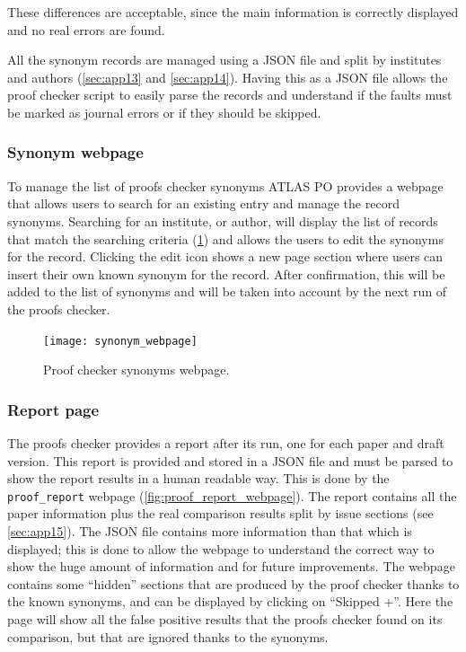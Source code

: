 These differences are acceptable, since the main information is correctly displayed and no real errors are found.

All the synonym records are managed using a JSON file and split by institutes and authors (\cref{sec:app13} and \cref{sec:app14}).
Having this as a JSON file allows the proof checker script to easily parse the records and understand if the faults must be marked as journal errors or if they should be skipped.

\subsubsection{Synonym webpage}
\label{sec:Synonym_webpage}

To manage the list of proofs checker synonyms ATLAS PO provides a webpage that allows users to search for an existing entry and manage the record synonyms. 
Searching for an institute, or author, will display the list of records that match the searching criteria (\cref{fig:synonym_webpage}) and allows the users to edit the synonyms for the record.
Clicking the edit icon shows a new page section where users can insert their own known synonym for the record.
After confirmation, this will be added to the list of synonyms and will be taken into account by the next run of the proofs checker.

\begin{figure}[htb]
  \centering
  \texttt{[image: synonym\_webpage]}
  \caption{Proof checker synonyms webpage.}
  \label{fig:synonym_webpage}
\end{figure}

\subsubsection{Report page}
\label{sec:Report_page}

The proofs checker provides a report after its run, one for each paper and draft version.
This report is provided and stored in a JSON file and must be parsed to show the report results in a human readable way.
This is done by the \texttt{proof\_report} webpage (\cref{fig:proof_report_webpage}).
The report contains all the paper information plus the real comparison results split by issue sections (see \cref{sec:app15}).
The JSON file contains more information than that which is displayed;
this is done to allow the webpage to understand the correct way to show the huge amount of information and for future improvements.
The webpage contains some \enquote{hidden} sections that are produced by the proof checker thanks to the known synonyms,
and can be displayed by clicking on \enquote{Skipped +}.
Here the page will show all the false positive results that the proofs checker found on its comparison, but that are ignored thanks to the synonyms.

